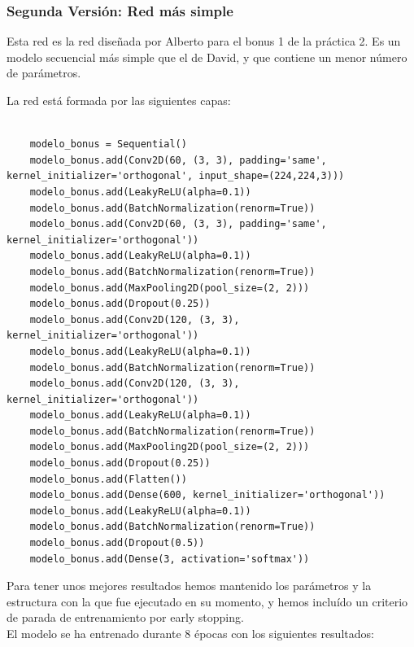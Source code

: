 \documentclass[11pt,a4paper]{article}
\theoremstyle{definition}
\begin{document}
\subsubsection{Segunda Versión: Red más simple}

Esta red es la red diseñada por Alberto para el bonus 1 de la práctica 2. Es un modelo secuencial más simple que el de David, y que contiene un menor número de parámetros.

La red está formada por las siguientes capas:

\begin{lstlisting}

    modelo_bonus = Sequential()
    modelo_bonus.add(Conv2D(60, (3, 3), padding='same', kernel_initializer='orthogonal', input_shape=(224,224,3)))
    modelo_bonus.add(LeakyReLU(alpha=0.1))
    modelo_bonus.add(BatchNormalization(renorm=True))
    modelo_bonus.add(Conv2D(60, (3, 3), padding='same', kernel_initializer='orthogonal'))
    modelo_bonus.add(LeakyReLU(alpha=0.1))
    modelo_bonus.add(BatchNormalization(renorm=True))
    modelo_bonus.add(MaxPooling2D(pool_size=(2, 2)))
    modelo_bonus.add(Dropout(0.25))
    modelo_bonus.add(Conv2D(120, (3, 3), kernel_initializer='orthogonal'))
    modelo_bonus.add(LeakyReLU(alpha=0.1))
    modelo_bonus.add(BatchNormalization(renorm=True))
    modelo_bonus.add(Conv2D(120, (3, 3), kernel_initializer='orthogonal'))
    modelo_bonus.add(LeakyReLU(alpha=0.1))
    modelo_bonus.add(BatchNormalization(renorm=True))
    modelo_bonus.add(MaxPooling2D(pool_size=(2, 2)))
    modelo_bonus.add(Dropout(0.25))
    modelo_bonus.add(Flatten())
    modelo_bonus.add(Dense(600, kernel_initializer='orthogonal'))
    modelo_bonus.add(LeakyReLU(alpha=0.1))
    modelo_bonus.add(BatchNormalization(renorm=True))
    modelo_bonus.add(Dropout(0.5))
    modelo_bonus.add(Dense(3, activation='softmax'))

\end{lstlisting}

Para tener unos mejores resultados hemos mantenido los parámetros y la estructura con la que fue ejecutado en su momento, y hemos incluído un criterio de parada de entrenamiento por early stopping.\\

El modelo se ha entrenado durante 8 épocas con los siguientes resultados:
\end{document}

